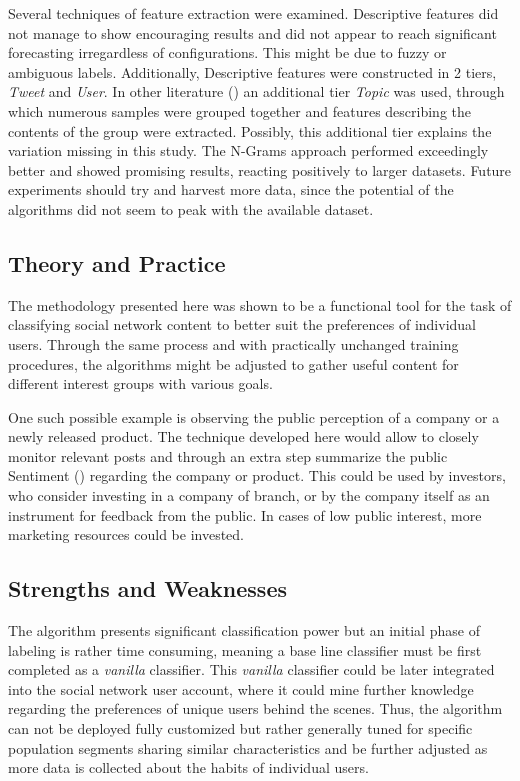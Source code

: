 	\par
	
	Several techniques of feature extraction were examined. Descriptive features did not manage to show encouraging results and did not appear to reach significant forecasting irregardless of configurations. This might be due to fuzzy or ambiguous labels. Additionally, Descriptive features were constructed in 2 tiers, \textit{Tweet} and \textit{User}. In other literature (\cite{castillo2011information}) an additional tier \textit{Topic} was used, through which numerous samples were grouped together and features describing the contents of the group were extracted. Possibly, this additional tier explains the variation missing in this study.
	The N-Grams approach performed exceedingly better and showed promising results, reacting positively to larger datasets. Future experiments should try and harvest more data, since the potential of the algorithms did not seem to peak with the available dataset.
	
	\subsection{Theory and Practice}
		The methodology presented here was shown to be a functional tool for the task of classifying social network content to better suit the preferences of individual users. Through the same process and with practically unchanged training procedures, the algorithms might be adjusted to gather useful content for different interest groups with various goals.
		
		\par 
		
		One such possible example is observing the public perception of a company or a newly released product. The technique developed here would allow to closely monitor relevant posts and through an extra step summarize the public Sentiment (\cite{go2009twitter}) regarding the company or product. This could be used by investors, who consider investing in a company of branch, or by the company itself as an instrument for feedback from the public. In cases of low public interest, more marketing resources could be invested.
	
	\subsection{Strengths and Weaknesses}
		The algorithm presents significant classification power but an initial phase of labeling is rather time consuming,  meaning a base line classifier must be first completed as a \textit{vanilla} classifier. This \textit{vanilla} classifier could be later integrated into the social network user account, where it could mine further knowledge regarding the preferences of unique users behind the scenes. Thus, the algorithm can not be deployed fully customized but rather generally tuned for specific population segments sharing similar characteristics and be further adjusted as more data is collected about the habits of individual users. 
		
